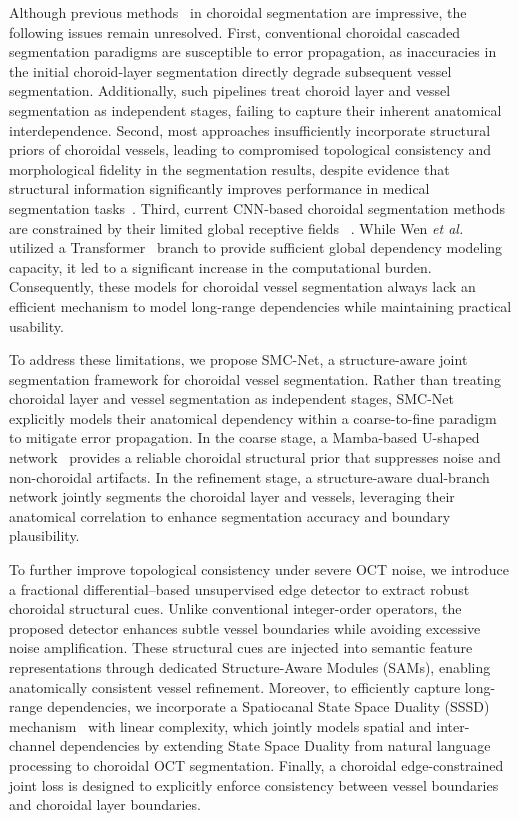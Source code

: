 \documentclass[lettersize,journal]{IEEEtran}
\begin{document}
Although previous methods~\cite{choroidnet,wen2024} in choroidal segmentation are impressive, the following issues remain unresolved. First, conventional choroidal cascaded segmentation paradigms are susceptible to error propagation, as inaccuracies in the initial choroid‑layer segmentation directly degrade subsequent vessel segmentation.
Additionally, such pipelines treat choroid layer and vessel segmentation as independent stages, failing to capture their inherent anatomical interdependence. Second, most approaches insufficiently incorporate structural priors of choroidal vessels, leading to compromised topological consistency and morphological fidelity in the segmentation results, despite evidence that structural information significantly improves performance in medical segmentation tasks~\cite{BEFD,structure_driven,dual_encoder_edge}.
Third, current CNN‑based choroidal segmentation methods are constrained by their limited global receptive fields ~\cite{Liu2019refine,choroidnet}. While Wen \textit{et al.}~\cite{wen2024} utilized a Transformer~\cite{vit} branch to provide sufficient global dependency modeling capacity, it led to a significant increase in the computational burden.
Consequently, these models for choroidal vessel segmentation always lack an efficient mechanism to model long‑range dependencies while maintaining practical usability.

To address these limitations, we propose SMC-Net, a structure-aware joint segmentation framework for choroidal vessel segmentation. Rather than treating choroidal layer and vessel segmentation as independent stages, SMC-Net explicitly models their anatomical dependency within a coarse-to-fine paradigm to mitigate error propagation. In the coarse stage, a Mamba-based U-shaped network~\cite{gu2024mamba} provides a reliable choroidal structural prior that suppresses noise and non-choroidal artifacts. In the refinement stage, a structure-aware dual-branch network jointly segments the choroidal layer and vessels, leveraging their anatomical correlation to enhance segmentation accuracy and boundary plausibility.

To further improve topological consistency under severe OCT noise, we introduce a fractional differential–based unsupervised edge detector to extract robust choroidal structural cues. Unlike conventional integer-order operators, the proposed detector enhances subtle vessel boundaries while avoiding excessive noise amplification. These structural cues are injected into semantic feature representations through dedicated Structure-Aware Modules (SAMs), enabling anatomically consistent vessel refinement. Moreover, to efficiently capture long-range dependencies, we incorporate a Spatiocanal State Space Duality (SSSD) mechanism~\cite{dao2024transformers} with linear complexity, which jointly models spatial and inter-channel dependencies by extending State Space Duality from natural language processing to choroidal OCT segmentation. Finally, a choroidal edge-constrained joint loss is designed to explicitly enforce consistency between vessel boundaries and choroidal layer boundaries.
\end{document}
